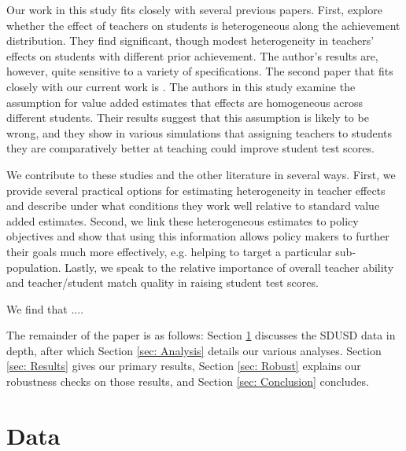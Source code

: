 \documentclass[letterpaper,12pt]{article}
\begin{document}
Our work in this study fits closely with several previous papers. First, \citet{lockwood2009} explore whether the effect of teachers on students is heterogeneous along the achievement distribution. They find significant, though modest heterogeneity in teachers' effects on students with different prior achievement. The author's results are, however, quite sensitive to a variety of specifications. The second paper that fits closely with our current work is \citet{condie2014teacher}. The authors in this study examine the assumption for value added estimates that effects are homogeneous across different students. Their results suggest that this assumption is likely to be wrong, and they show in various simulations that assigning teachers to students they are comparatively better at teaching could improve student test scores.

We contribute to these studies and the other literature in several ways. First, we provide several practical options for estimating heterogeneity in teacher effects and describe under what conditions they work well relative to standard value added estimates. Second, we link these heterogeneous estimates to policy objectives and show that using this information allows policy makers to further their goals much more effectively, e.g. helping to target a particular sub-population. Lastly, we speak to the relative importance of overall teacher ability and teacher/student match quality in raising student test scores.


We find that ....

The remainder of the paper is as follows: Section \ref{sec: Data} discusses the SDUSD data in depth, after which Section \ref{sec: Analysis} details our various analyses. Section \ref{sec: Results} gives our primary results, Section \ref{sec: Robust} explains our robustness checks on those results, and Section \ref{sec: Conclusion} concludes.





\section{Data}\label{sec: Data}
\end{document}
